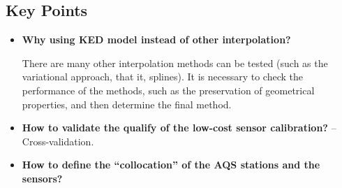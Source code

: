 \documentclass{article}
\begin{document}
\subsection{Key Points}
\begin{itemize}
    \item \textbf{Why using KED model instead of other interpolation?} {
    
    There are many other interpolation methods can be tested (such as the variational approach, that it, splines). It is necessary to check the performance of the methods, such as the preservation of geometrical properties, and then determine the final method.
    }
    \item \textbf{How to validate the qualify of the low-cost sensor calibration?} -- Cross-validation.
    \item \textbf{How to define the ``collocation'' of the AQS stations and the sensors?} {
    
}
\end{itemize}
\end{document}
